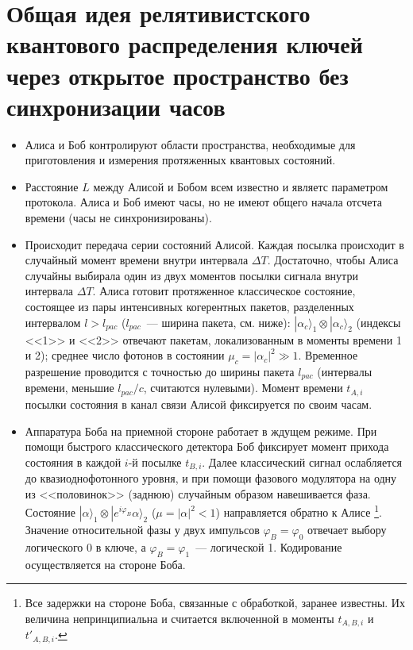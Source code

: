 \section[Общая схема протокола]{Общая идея релятивистского квантового распределения ключей через открытое пространство без синхронизации часов}
\begin{itemize}
  \item Алиса и Боб контролируют области пространства, необходимые для приготовления и измерения протяженных квантовых состояний.
  \item Расстояние $L$ между Алисой и Бобом всем известно и являетс параметром протокола. Алиса и Боб имеют часы, но не имеют общего начала отсчета времени (часы не синхронизированы).
  \item Происходит передача серии состояний Алисой. Каждая посылка происходит в случайный момент времени внутри интервала $\Delta T$. 
  Достаточно, чтобы Алиса случайны выбирала один из двух моментов посылки сигнала внутри интервала $\Delta T$. 
  Алиса готовит протяженное классическое состояние, состоящее из пары интенсивных когерентных пакетов, разделенных интервалом $l > l_{pac}$ ($l_{pac}$~--- ширина пакета, см. ниже): 
  $|\alpha_c\rangle_1 \otimes|\alpha_c\rangle_2$ (индексы <<1>> и <<2>> отвечают пакетам, локализованным в моменты времени 1 и 2); среднее число фотонов в состоянии $\mu_c = |\alpha_c|^2 \gg 1$. 
  Временное разрешение проводится с точностью до ширины пакета $l_{pac}$ (интервалы времени, меньшие $l_{pac} / c$, считаются нулевыми). 
  Момент времени $t_{A,i}$ посылки состояния в канал связи Алисой фиксируется по своим часам.
  
  \item Аппаратура Боба на приемной стороне работает в ждущем режиме. При помощи быстрого классического детектора Боб фиксирует момент прихода состояния в каждой $i$-й посылке $t_{B,i}$. 
  Далее классический сигнал ослабляется до квазиоднофотонного уровня, и при помощи фазового модулятора на одну из <<половинок>> (заднюю) случайным образом навешивается фаза. 
  Состояние $|\alpha\rangle_1 \otimes |e^{i\varphi_B}\alpha\rangle_2$ ($\mu = |\alpha|^2 < 1$) направляется обратно к Алисе 
  \footnote{Все задержки на стороне Боба, связанные с обработкой, заранее известны. Их величина непринципиальна и считается включенной в моменты $t_{A,B,i}$ и $t'_{A,B,i}$.}. 
  Значение относительной фазы у двух импульсов $\varphi_B = \varphi_0$ отвечает выбору логического 0 в ключе, а $\varphi_B = \varphi_1$~--- логической 1. 
  Кодирование осуществляется на стороне Боба.
  

\end{itemize}
